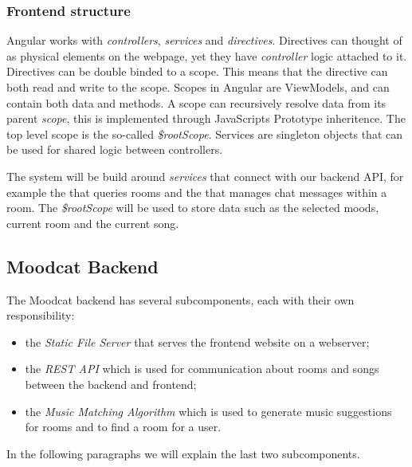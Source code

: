 \label{frontendstructure}
\subsubsection{Frontend structure}
Angular works with \textit{controllers}, \textit{services} and \textit{directives}.
Directives can thought of as physical elements on the webpage, yet they have \textit{controller} logic attached to it.
Directives can be double binded to a scope. This means that the directive can both read and write to the scope.
Scopes in Angular are \glspl{ViewModel}, and can contain both data and methods.
A scope can recursively resolve data from its parent \textit{scope}, this is implemented through JavaScripts \gls{Prototype inheritence}.
The top level scope is the so-called \textit{\$rootScope}.
Services are singleton objects that can be used for shared logic between controllers.

\par
The system will be build around \textit{services} that connect with our backend API, for example the  that queries rooms and the  that manages chat messages within a room.
The \textit{\$rootScope} will be used to store data such as the selected moods, current room and the current song.

\subsection{Moodcat Backend}
The Moodcat backend has several subcomponents, each with their own responsibility:
\begin{itemize}
\item the \textit{Static File Server} that serves the frontend website on a webserver;
\item the \textit{REST API} which is used for communication about rooms and songs between the backend and frontend;
\item the \textit{Music Matching Algorithm} which is used to generate music suggestions for rooms and to find a room for a user.
\end{itemize}
In the following paragraphs we will explain the last two subcomponents.

